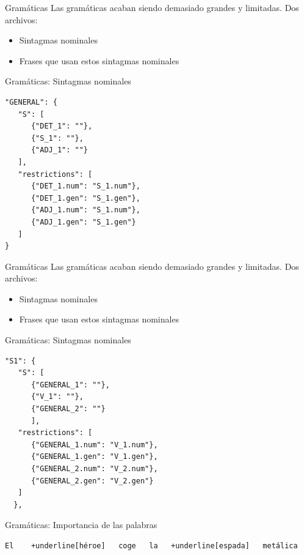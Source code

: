 \begin{frame}[t, fragile]{Gramáticas}
	Las gramáticas acaban siendo demasiado grandes y limitadas. Dos archivos:
	\begin{itemize}
		\item<+-| alert@+> Sintagmas nominales
		\item Frases que usan estos sintagmas nominales
	\end{itemize}
\end{frame}

\begin{frame}[t, fragile]{Gramáticas: Sintagmas nominales}
	\begin{Verbatim}
"GENERAL": {
   "S": [
      {"DET_1": ""}, 
      {"S_1": ""},
      {"ADJ_1": ""}
   ],
   "restrictions": [
      {"DET_1.num": "S_1.num"},
      {"DET_1.gen": "S_1.gen"},
      {"ADJ_1.num": "S_1.num"},
      {"ADJ_1.gen": "S_1.gen"}
   ]
}
	\end{Verbatim}
\end{frame}

\begin{frame}[t, fragile]{Gramáticas}
	Las gramáticas acaban siendo demasiado grandes y limitadas. Dos archivos:
	\begin{itemize}
		\item Sintagmas nominales
		\item<+-| alert@+> Frases que usan estos sintagmas nominales
	\end{itemize}
\end{frame}

\begin{frame}[t, fragile]{Gramáticas: Sintagmas nominales}
	\begin{Verbatim}
"S1": {
   "S": [
      {"GENERAL_1": ""},
      {"V_1": ""},
      {"GENERAL_2": ""}
      ],
   "restrictions": [
      {"GENERAL_1.num": "V_1.num"},
      {"GENERAL_1.gen": "V_1.gen"},
      {"GENERAL_2.num": "V_2.num"},
      {"GENERAL_2.gen": "V_2.gen"}
   ]
  },
	\end{Verbatim}
\end{frame}

\begin{frame}[t, fragile]{Gramáticas: Importancia de las palabras}
	\vspace*{\fill}
		\begin{Verbatim}[commandchars=+\[\]]
El    +underline[héroe]   coge   la   +underline[espada]   metálica
		\end{Verbatim}
	\vspace*{\fill}
\end{frame}

